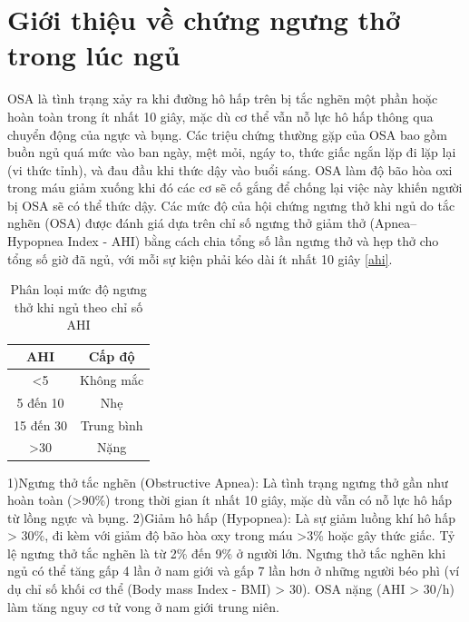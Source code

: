 
\section{Giới thiệu về chứng ngưng thở trong lúc ngủ}
\gls{OSA}\cite{osa_summary}\cite{ThaySYOSA} là tình trạng xảy ra khi đường hô hấp trên bị tắc nghẽn một phần hoặc hoàn toàn trong ít nhất 10 giây, mặc dù cơ thể vẫn nỗ lực hô hấp thông qua chuyển động của ngực và bụng. Các triệu chứng thường gặp của OSA bao gồm buồn ngủ quá mức vào ban ngày, mệt mỏi, ngáy to, thức giấc ngắn lặp đi lặp lại (vi thức tỉnh), và đau đầu khi thức dậy vào buổi sáng. OSA làm độ bão hòa oxi trong máu giảm xuống khi đó các cơ sẽ cố gắng để chống lại việc này khiến người bị OSA sẽ có thể thức dậy. Các mức độ của hội chứng ngưng thở khi ngủ do tắc nghẽn (OSA) được đánh giá dựa trên chỉ số ngưng thở giảm thở (Apnea–Hypopnea Index - AHI) bằng cách chia tổng số lần ngưng thở và hẹp thở cho tổng số giờ đã ngủ, với mỗi sự kiện phải kéo dài ít nhất 10 giây \ref{ahi}.

\begin{table}[h!]
\caption{Phân loại mức độ ngưng thở khi ngủ theo chỉ số \gls{AHI}}
\label{ahi}
\vspace{-3mm}
\begin{center}
\begin{tabular}{|c|c|}
\hline
AHI & Cấp độ \\
\hline
<5 & Không mắc \\
5 đến 10 & Nhẹ \\
15 đến 30 & Trung bình \\
>30 & Nặng \\
\hline
\end{tabular}
\label{tab1}
\end{center}
\end{table}


1)Ngưng thở tắc nghẽn (Obstructive Apnea): Là tình trạng ngưng thở gần như hoàn toàn (>90\%) trong thời gian ít nhất 10 giây, mặc dù vẫn có nỗ lực hô hấp từ lồng ngực và bụng. 2)Giảm hô hấp (Hypopnea): Là sự giảm luồng khí hô hấp > 30\%, đi kèm với giảm độ bão hòa oxy trong máu >3\% hoặc gây thức giấc. Tỷ lệ ngưng thở tắc nghẽn là từ 2\% đến 9\% ở người lớn. Ngưng thở tắc nghẽn khi ngủ có thể tăng gấp 4 lần ở nam giới và gấp 7 lần hơn ở những người béo phì (ví dụ chỉ số khối cơ thể (Body mass Index - BMI) > 30). OSA nặng (AHI > 30/h) làm tăng nguy cơ tử vong ở nam giới trung niên.

